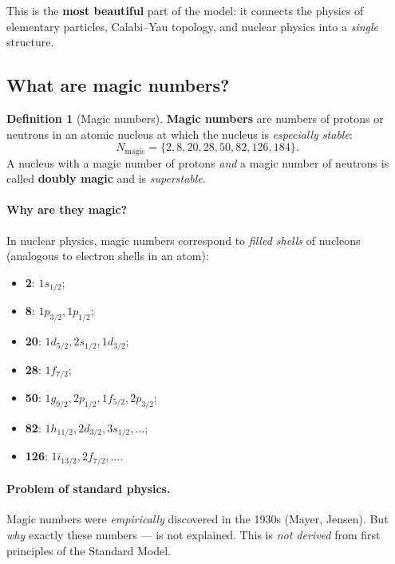 \documentclass[11pt,a4paper]{article}
\theoremstyle{definition}
\newtheorem{definition}[theorem]{Definition}
\begin{document}
This is the \textbf{most beautiful} part of the model: it connects 
the physics of elementary particles, Calabi--Yau topology, and nuclear 
physics into a \emph{single} structure.

\subsection{What are magic numbers?}
\label{subsec:magic-intro}

\begin{definition}[Magic numbers]
\label{def:magic-numbers}
\textbf{Magic numbers} are numbers of protons or neutrons 
in an atomic nucleus at which the nucleus is \emph{especially stable}:
\begin{equation}
    N_{\text{magic}} = \{2, 8, 20, 28, 50, 82, 126, 184\}.
\end{equation}
A nucleus with a magic number of protons \emph{and} a magic number 
of neutrons is called \textbf{doubly magic} and is 
\emph{superstable}.
\end{definition}

\paragraph{Why are they magic?}
In nuclear physics, magic numbers correspond to \emph{filled 
shells} of nucleons (analogous to electron shells in an atom):
\begin{itemize}
    \item \textbf{2}: $1s_{1/2}$;
    \item \textbf{8}: $1p_{3/2}, 1p_{1/2}$;
    \item \textbf{20}: $1d_{5/2}, 2s_{1/2}, 1d_{3/2}$;
    \item \textbf{28}: $1f_{7/2}$;
    \item \textbf{50}: $1g_{9/2}, 2p_{1/2}, 1f_{5/2}, 2p_{3/2}$;
    \item \textbf{82}: $1h_{11/2}, 2d_{3/2}, 3s_{1/2}, \ldots$;
    \item \textbf{126}: $1i_{13/2}, 2f_{7/2}, \ldots$.
\end{itemize}

\paragraph{Problem of standard physics.}
Magic numbers were \emph{empirically} discovered in the 1930s 
(Mayer, Jensen). But \emph{why} exactly these numbers — 
is not explained. This is \emph{not derived} from first principles 
of the Standard Model.
\end{document}
